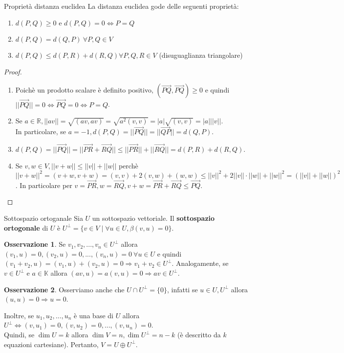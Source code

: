\documentclass[a4paper]{article}
\theoremstyle{definition}
\newtheorem*{oss}{Osservazione}
\begin{document}
	\begin{teo}{Proprietà distanza euclidea}{}
		La distanza euclidea gode delle seguenti proprietà:
		\begin{enumerate}
			\item $d(P, Q) \ge 0$ e $d(P, Q) = 0 \Leftrightarrow P = Q$
			\item $d(P, Q) = d(Q, P) \ \forall P, Q \in V$
			\item $d(P, Q) \le d(P, R) + d(R, Q) \forall P, Q, R \in V$ (disuguaglianza triangolare)
		\end{enumerate}
	\end{teo}
	\begin{proof}
		\begin{enumerate}
			\item Poichè un prodotto scalare è definito positivo, $(\overrightarrow{PQ}, \overrightarrow{PQ}) \ge 0$ e quindi $||\overrightarrow{PQ}|| = 0 \Leftrightarrow \overrightarrow{PQ} = 0 \Leftrightarrow P = Q$.
			\item Se $a \in \mathbb{R}, ||av|| = \sqrt{(av, av)} = \sqrt{a^2(v, v)} = |a|\sqrt{(v, v)} = |a|||v||$. \\
			In particolare, se $a = -1, d(P, Q) = ||\overrightarrow{PQ}|| = ||\overrightarrow{QP}|| = d(Q, P)$.
			\item $d(P, Q) = ||\overrightarrow{PQ}|| = ||\overrightarrow{PR} + \overrightarrow{RQ}|| \le ||\overrightarrow{PR}|| + ||\overrightarrow{RQ}|| = d(P, R) + d(R, Q)$.
			\item Se $v, w \in V, ||v+w|| \le ||v|| + ||w||$ perchè $||v+w||^2 = (v+w, v+w) = (v, v) + 2(v, w) + (w, w) \le ||v||^2 + 2||v||\cdot||w|| + ||w||^2 = (||v|| + ||w||)^2$.
			In particolare per $v = \overrightarrow{PR}, w = \overrightarrow{RQ}, v + w = \overrightarrow{PR} + \overrightarrow{RQ} \le \overrightarrow{PQ}$.
		\end{enumerate}
	\end{proof}

	\begin{deff}{Sottospazio ortoganale}{}
		Sia $U$ un sottospazio vettoriale.
		Il \textbf{sottospazio ortogonale} di $U$ è $U^\perp = \{v \in V \mid \forall u \in U, \beta(v, u) = 0\}$.
	\end{deff}
	\begin{oss}
		Se $v_1, v_2, ..., v_n \in U^\perp$ allora $(v_1, u) = 0, (v_2, u) = 0, ..., (v_n, u) = 0 \ \forall u \in U$ e quindi $(v_1 + v_2, u) = (v_1, u) + (v_2, u) = 0 \Rightarrow v_1 + v_2 \in U^\perp$.
		Analogamente, se $v \in U^\perp$ e $a \in \mathbb{K}$ allora $(av, u) = a(v, u) = 0 \Rightarrow av \in U^\perp$.
	\end{oss}
	\begin{oss}
		Osserviamo anche che $U \cap U^\perp = \{0\}$, infatti se $u \in U, U^\perp$ allora $(u, u) = 0 \Rightarrow u = 0$.
	\end{oss}
	Inoltre, se $u_1, u_2, ..., u_n$ è una base di $U$ allora $U^\perp \Leftrightarrow (v, u_1) = 0, (v, u_2) = 0, ..., (v, u_n) = 0$. \\
	Quindi, se $\dim U = k$ allora $\dim V = n, \dim U^\perp = n - k$ (è descritto da $k$ equazioni cartesiane).
	Pertanto, $V = U \oplus U^\perp$.
\end{document}
